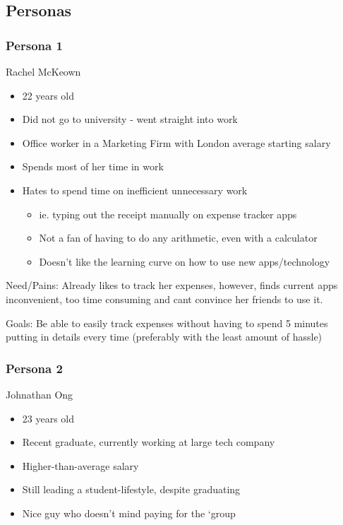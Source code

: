 \documentclass[a4wide, 10pt]{article}
\begin{document}

\subsection{Personas}
\label{persona}
\subsubsection{Persona 1}
Rachel McKeown 
\vspace{-2ex}
\begin{itemize}
  \item 22 years old
  \item Did not go to university - went straight into work
  \item Office worker in a Marketing Firm with London average starting salary
  \item Spends most of her time in work 
  \item Hates to spend time on inefficient unnecessary work
  \begin{itemize}
    \item ie. typing out the receipt manually on expense tracker apps
    \item Not a fan of having to do any arithmetic, even with a calculator
    \item Doesn’t like the learning curve on how to use new apps/technology
  \end{itemize}
\end{itemize}
  
Need/Pains: Already likes to track her expenses, however, finds current apps inconvenient, too time consuming and cant convince her friends to use it.

Goals: Be able to easily track expenses without having to spend 5 minutes putting in details every time (preferably with the least amount of hassle)


\subsubsection{Persona 2}
Johnathan Ong
\vspace{-2ex}
\begin{itemize}
  \item 23 years old
  \item Recent graduate, currently working at large tech company
  \item Higher-than-average salary
  \item Still leading a student-lifestyle, despite graduating
  \item Nice guy who doesn’t mind paying for the `group
\end{itemize}
\end{document}
